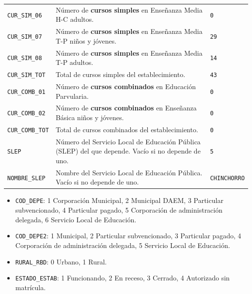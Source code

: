 \documentclass[10.5pt]{article}
\begin{document}
\begin{xltabular}{\linewidth}{@{}p{4.5cm} >{\raggedright\arraybackslash}X p{3.4cm}@{}}
\texttt{CUR\_\allowbreak{}SIM\_\allowbreak{}06} & Número de \textbf{cursos simples} en Enseñanza Media H-C adultos. & \texttt{0} \\
\texttt{CUR\_\allowbreak{}SIM\_\allowbreak{}07} & Número de \textbf{cursos simples} en Enseñanza Media T-P niños y jóvenes. & \texttt{29} \\
\texttt{CUR\_\allowbreak{}SIM\_\allowbreak{}08} & Número de \textbf{cursos simples} en Enseñanza Media T-P adultos. & \texttt{14} \\
\texttt{CUR\_\allowbreak{}SIM\_\allowbreak{}TOT} & Total de cursos simples del establecimiento. & \texttt{43} \\
\texttt{CUR\_\allowbreak{}COMB\_\allowbreak{}01} & Número de \textbf{cursos combinados} en Educación Parvularia. & \texttt{0} \\
\texttt{CUR\_\allowbreak{}COMB\_\allowbreak{}02} & Número de \textbf{cursos combinados} en Enseñanza Básica niños y jóvenes. & \texttt{0} \\
\texttt{CUR\_\allowbreak{}COMB\_\allowbreak{}TOT} & Total de cursos combinados del establecimiento. & \texttt{0} \\
\texttt{SLEP} & Número del Servicio Local de Educación Pública (SLEP) del que depende. Vacío si no depende de uno. & \texttt{5} \\
\texttt{NOMBRE\_\allowbreak{}SLEP} & Nombre del Servicio Local de Educación Pública. Vacío si no depende de uno. & \texttt{CHINCHORRO} \\
\end{xltabular}

\begin{formulabox}
\begin{itemize}[leftmargin=1.1em,itemsep=2pt,topsep=2pt]
\item \texttt{COD\_\allowbreak{}DEPE}: 1 Corporación Municipal, 2 Municipal DAEM, 3 Particular subvencionado, 4 Particular pagado, 5 Corporación de administración delegada, 6 Servicio Local de Educación.
\item \texttt{COD\_\allowbreak{}DEPE2}: 1 Municipal, 2 Particular subvencionado, 3 Particular pagado, 4 Corporación de administración delegada, 5 Servicio Local de Educación.
\item \texttt{RURAL\_\allowbreak{}RBD}: 0 Urbano, 1 Rural.
\item \texttt{ESTADO\_\allowbreak{}ESTAB}: 1 Funcionando, 2 En receso, 3 Cerrado, 4 Autorizado sin matrícula.
\end{itemize}
\end{formulabox}
\end{document}

